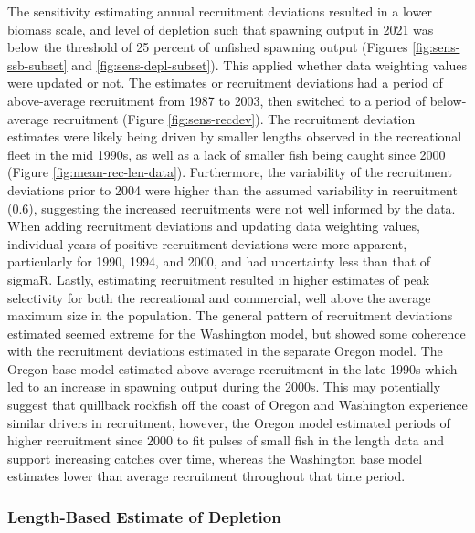 \documentclass[11pt,
  english,
  a4paper,
]{article}
\begin{document}
The sensitivity estimating annual recruitment deviations resulted in a lower biomass scale, and level of depletion such that spawning output in 2021 was below the threshold of 25 percent of unfished spawning output (Figures \ref{fig:sens-ssb-subset} and \ref{fig:sens-depl-subset}). This applied whether data weighting values were updated or not. The estimates or recruitment deviations had a period of above-average recruitment from 1987 to 2003, then switched to a period of below-average recruitment (Figure \ref{fig:sens-recdev}). The recruitment deviation estimates were likely being driven by smaller lengths observed in the recreational fleet in the mid 1990s, as well as a lack of smaller fish being caught since 2000 (Figure \ref{fig:mean-rec-len-data}). Furthermore, the variability of the recruitment deviations prior to 2004 were higher than the assumed variability in recruitment (0.6), suggesting the increased recruitments were not well informed by the data. When adding recruitment deviations and updating data weighting values, individual years of positive recruitment deviations were more apparent, particularly for 1990, 1994, and 2000, and had uncertainty less than that of sigmaR. Lastly, estimating recruitment resulted in higher estimates of peak selectivity for both the recreational and commercial, well above the average maximum size in the population. The general pattern of recruitment deviations estimated seemed extreme for the Washington model, but showed some coherence with the recruitment deviations estimated in the separate Oregon model. The Oregon base model estimated above average recruitment in the late 1990s which led to an increase in spawning output during the 2000s. This may potentially suggest that quillback rockfish off the coast of Oregon and Washington experience similar drivers in recruitment, however, the Oregon model estimated periods of higher recruitment since 2000 to fit pulses of small fish in the length data and support increasing catches over time, whereas the Washington base model estimates lower than average recruitment throughout that time period.

\leavevmode\tagmcend\tagstructend\par


\hypertarget{length-based-estimate-of-depletion}{%
\subsubsection{Length-Based Estimate of Depletion}\label{length-based-estimate-of-depletion}}
\end{document}
